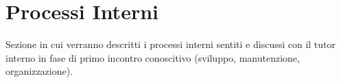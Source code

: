 \section{Processi Interni}

Sezione in cui verranno descritti i processi interni sentiti e discussi con il tutor interno in fase di primo incontro conoscitivo (sviluppo, manutenzione, organizzazione).